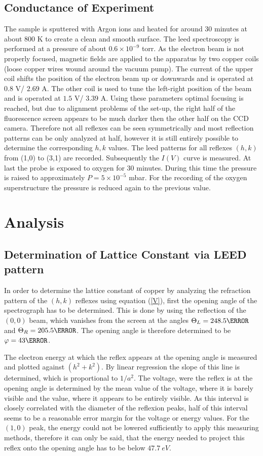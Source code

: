 \documentclass[a4paper]{scrartcl}
\numberwithin{equation}{section}
\numberwithin{figure}{section}
\numberwithin{table}{section}
\newcommand{\Formel}[1]{(\ref{#1})}
\begin{document}
\subsection{Conductance of Experiment}
\label{sec:experiment}
The sample is sputtered with Argon ions and heated for around 30 minutes at about 800 K to create a clean and smooth surface. The leed spectroscopy is performed at a pressure of about $0.6 \times 10^{-9}$ torr. As the electron beam is not properly focused, magnetic fields are applied to the apparatus by two copper coils (loose copper wires wound around the vacuum pump). The current of the upper coil shifts the position of the electron beam up or downwards and is operated at $0.8$ V/ $2.69$ A. The other coil is used to tune the left-right position of the beam and is operated at $1.5$ V/ $3.39$ A. Using these parameters optimal focusing is reached, but due to alignment problems of the set-up, the right half of the fluorescence screen appears to be much darker then the other half on the CCD camera. Therefore not all reflexes can be seen symmetrically and most reflection patterns can be only analyzed at half, however it is still entirely possible to determine the corresponding $h,k$ values. The leed patterns for all reflexes $(h,k)$ from (1,0) to (3,1) are recorded. Subsequently the $I(V)$ curve is measured. At last the probe is exposed to oxygen for 30 minutes. During this time the pressure is raised to approximately $P=5 \times 10^{-5}$ mbar. For the recording of the oxygen superstructure the pressure is reduced again to the previous value.

\clearpage
\section{Analysis}
\subsection{Determination of Lattice Constant via LEED pattern}
In order to determine the lattice constant of copper by analyzing the refraction pattern of the $(h,k)$ reflexes using equation \Formel{V}, first the opening angle of the spectrograph has to be determined. This is done by using the reflection of the $(0,0)$ beam, which vanishes from the screen at the angles $\Theta_L = 248.5 \degree$ and $\Theta_R=205.5 \degree$. The opening angle is therefore determined to be $\varphi=43 \degree$. 

The electron energy at which the reflex appears at the opening angle is measured and plotted against $(h^2+k^2)$. By linear regression the slope of this line is determined, which is proportional to $ 1/a^2 $. The voltage, were the reflex is at the opening angle is determined by the mean value of the voltage, where it is barely visible and the value, where it appears to be entirely visible. As this interval is closely correlated with the diameter of the reflexion peaks, half of this interval seems to be a reasonable error margin for the voltage or energy  values. For the $(1,0)$ peak, the energy could not be lowered sufficiently to apply this measuring methods, therefore it can only be said, that the energy needed to project this reflex onto the opening angle has to be below $\SI{47.7}{eV}$. 
\end{document}
